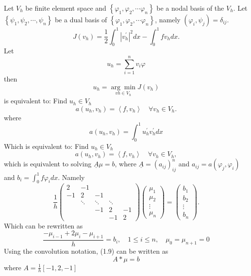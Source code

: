 \documentclass[10pt]{article}
\begin{document}
Let $V_{h}$ be finite element space and $\left\{\varphi_{1}, \varphi_{2}, \cdots \varphi_{n}\right\}$ be a nodal basis of the $V_{h} .$ Let $\left\{\psi_{1}, \psi_{2}, \cdots, \psi_{n}\right\}$ be a dual basis of $\left\{\varphi_{1}, \varphi_{2}, \cdots \varphi_{n}\right\}$, namely $\left(\varphi_{i}, \psi_{j}\right)=\delta_{i j} .$
$$
J\left(v_{h}\right)=\frac{1}{2} \int_{0}^{1}\left|v_{h}^{\prime}\right|^{2} d x-\int_{0}^{1} f v_{h} d x .
$$
Let
$$
u_{h}=\sum_{i=1}^{n} v_{i} \varphi
$$
then
$$
u_{h}=\underset{v h \in V_{h}}{\arg \min } J\left(v_{h}\right)
$$
is equivalent to: Find $u_{h} \in V_{h}$
$$
a\left(u_{h}, v_{h}\right)=\left\langle f, v_{h}\right\rangle \quad \forall v_{h} \in V_{h} .
$$
where
$$
a\left(u_{h}, v_{h}\right)=\int_{0}^{1} u_{h}^{\prime} v_{h}^{\prime} d x
$$
Which is equivalent to: Find $u_{h} \in V_{h}$
$$
a\left(u_{h}, v_{h}\right)=\left\langle f, v_{h}\right\rangle \quad \forall v_{h} \in V_{h},
$$
which is equivalent to solving $\underline{A} \mu=b$, where $\underline{A}=\left(a_{i j}\right)_{i j}^{n}$ and $a_{i j}=a\left(\varphi_{j}, \varphi_{i}\right)$ and $b_{i}=\int_{0}^{1} f \varphi_{i} d x .$ Namely
$$
\frac{1}{h}\left(\begin{array}{ccccc}
2 & -1 & & & \\
-1 & 2 & -1 & & \\
& \ddots & \ddots & \ddots & \\
& & -1 & 2 & -1 \\
& & & -1 & 2
\end{array}\right)\left(\begin{array}{c}
\mu_{1} \\
\mu_{2} \\
\vdots \\
\mu_{n}
\end{array}\right)=\left(\begin{array}{c}
b_{1} \\
b_{2} \\
\vdots \\
b_{n}
\end{array}\right) .
$$
Which can be rewritten as
$$
\frac{-\mu_{i-1}+2 \mu_{i}-\mu_{i+1}}{h}=b_{i}, \quad 1 \leq i \leq n, \quad \mu_{0}=\mu_{n+1}=0
$$
Using the convolution notation, (1.9) can be written as
$$
A * \mu=b
$$
where $A=\frac{1}{h}[-1,2,-1]$
\end{document}
